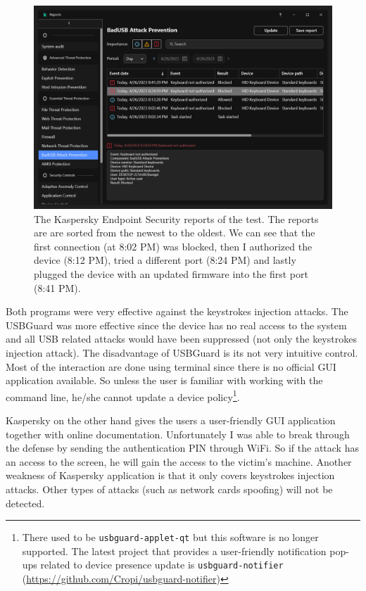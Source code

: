 \begin{figure}[ht]
    \centering
    \includegraphics[width=\linewidth]{./obrazky-figures/kaspersky_report.PNG}
    \caption{The Kaspersky Endpoint Security reports of the test. The reports are are sorted from the newest to the oldest. We can see that the first connection (at 8:02 PM) was blocked, then I authorized the device (8:12 PM), tried a different port (8:24 PM) and lastly plugged the device with an updated firmware into the first port (8:41 PM).}
    \label{fig:kaspersky_report}
\end{figure}

Both programs were very effective against the keystrokes injection attacks. The USBGuard was more effective since the device has no real access to the system and all USB related attacks would have been suppressed (not only the keystrokes injection attack). The disadvantage of USBGuard is its not very intuitive control. Most of the interaction are done using terminal since there is no official GUI application available. So unless the user is familiar with working with the command line, he/she cannot update a device policy\footnote{There used to be \texttt{usbguard-applet-qt} but this software is no longer supported. The latest project that provides a user-friendly notification pop-ups related to device presence update is \texttt{usbguard-notifier} (\url{https://github.com/Cropi/usbguard-notifier})}.

Kaspersky on the other hand gives the users a user-friendly GUI application together with online documentation. Unfortunately I was able to break through the defense by sending the authentication PIN through WiFi. So if the attack has an access to the screen, he will gain the access to the victim's machine. Another weakness of Kaspersky application is that it only covers keystrokes injection attacks. Other types of attacks (such as network cards spoofing) will not be detected.


